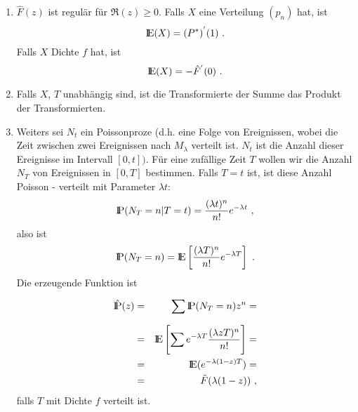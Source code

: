 \begin{appendix}
\begin{enumerate}
\item $ \hat F(z)$ ist regulär für $ \Re (z) \geq 0$. Falls $X$ eine
Verteilung $(p_{n})$ hat, ist
\begin{displaymath}
{\rm I\kern-0.2em E}(X) = (P^{*})^{'}(1) ~.
\end{displaymath}
Falls $X$ Dichte $f$ hat, ist
\begin{displaymath}
{\rm I\kern-0.2em E}(X) = -\hat F^{'}(0) ~.
\end{displaymath}
\item Falls $X$, $T$ unabhängig sind, ist die Transformierte der Summe
das Produkt der Transformierten.
\item Weiters sei $N_{t}$ ein Poissonproze\3 (d.h. eine Folge von
Ereignissen, wobei die Zeit zwischen zwei Ereignissen nach $M_{\lambda}$
verteilt ist. $N_{t}$ ist die Anzahl dieser Ereignisse im Intervall
$[0,t])$. Für eine zufällige Zeit $T$ wollen wir die Anzahl $N_{T}$ von
Ereignissen in $[0,T]$ bestimmen. Falls $T=t$ ist, ist diese Anzahl
Poisson - verteilt mit Parameter $\lambda t$:
\begin{displaymath}
{\rm I\kern-0.2em P} (N_{T} = n | T = t) = \frac{(\lambda t)^{n}}{n!} e^{- \lambda t} ~,
\end{displaymath}
also ist
\begin{displaymath}
{\rm I\kern-0.2em P} (N_{T} = n) = {\rm I\kern-0.2em E} \left[ \frac{( \lambda
T)^n}{n!} e^{- \lambda T} \right] ~.
\end{displaymath}
Die erzeugende Funktion ist
\begin{eqnarray*}
\hat {{\rm I\kern-0.2em P}}(z) &=&  \sum_{}^{} {\rm I\kern-0.2em P}(N_{T} = n) z^{n} = \\
&=& {\rm I\kern-0.2em E} \left[ \sum_{}^{} e^{-\lambda T} \frac{(\lambda z T)^{n}}{n!}
\right] = \\
&=& {\rm I\kern-0.2em E} (e^{- \lambda (1-z)T}) = \\
&=& \tilde F (\lambda(1-z)) ~,
\end{eqnarray*}
falls $T$ mit Dichte $f$ verteilt ist.
\end{enumerate}
\end{appendix}
